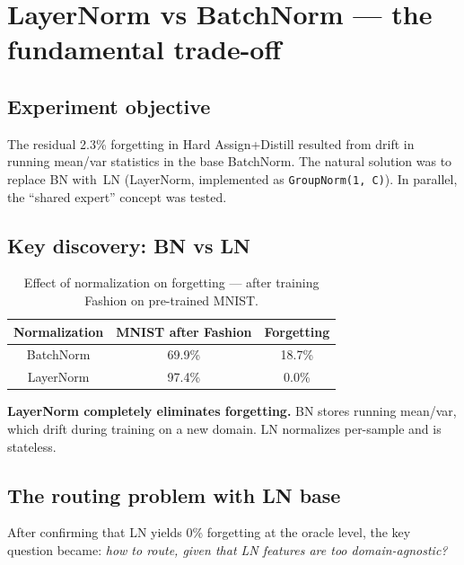 \documentclass[11pt,a4paper]{report}
\begin{document}


\section{LayerNorm vs BatchNorm --- the fundamental trade-off}
\label{sec:layernorm}

\subsection{Experiment objective}

The residual 2.3\% forgetting in Hard Assign+Distill resulted from drift in running mean/var statistics in the base BatchNorm. The natural solution was to replace BN with~LN (LayerNorm, implemented as \texttt{GroupNorm(1, C)}). In parallel, the ``shared expert'' concept was tested.

\subsection{Key discovery: BN vs LN}

\begin{table}[h]
\centering
\caption{Effect of normalization on forgetting --- after training Fashion on pre-trained MNIST.}
\begin{tabular}{c c c}
\hline
\textbf{Normalization} & \textbf{MNIST after Fashion} & \textbf{Forgetting} \\
\hline
BatchNorm & 69.9\% & 18.7\% \\
LayerNorm & 97.4\% & 0.0\% \\
\hline
\end{tabular}
\end{table}

\textbf{LayerNorm completely eliminates forgetting.} BN stores running mean/var, which drift during training on a new domain. LN normalizes per-sample and is stateless.

\subsection{The routing problem with LN base}

After confirming that LN yields 0\% forgetting at the oracle level, the key question became: \emph{how to route, given that LN features are too domain-agnostic?}
\end{document}
